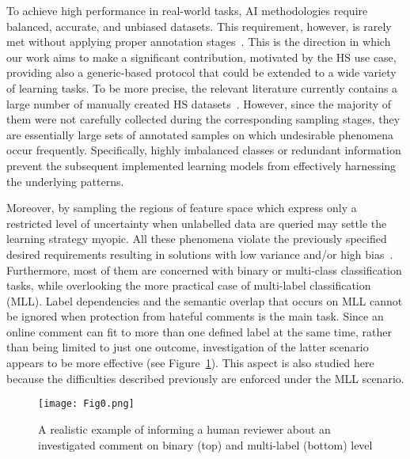 \documentclass{article}
\begin{document}
To achieve high performance in real-world tasks, AI methodologies require balanced, accurate, and unbiased datasets. This requirement, however, is rarely met without applying proper annotation stages~\cite{DBLP:conf/cikm/ChenMLZM19,ibrohim-budi-2019-multi}. This is the direction in which our work aims to make a significant contribution, motivated by the HS use case, providing also a generic-based protocol that could be extended to a wide variety of learning tasks. To be more precise, the relevant literature currently contains a large number of manually created HS datasets~\cite{waseem-hovy,DBLP:conf/naacl/ZampieriMNRFK19}. However, since the majority of them were not carefully collected during the corresponding sampling stages, they are essentially large sets of annotated samples on which undesirable phenomena occur frequently. Specifically, highly imbalanced classes or redundant information prevent the subsequent implemented learning models from effectively harnessing the underlying patterns. 

Moreover, by sampling the regions of feature space which express only a restricted level of uncertainty when unlabelled data are queried may settle the learning strategy myopic. All these phenomena violate the previously specified desired requirements resulting in solutions with low variance and/or high bias~\cite{DBLP:conf/lrec/RosendaalCN20}. Furthermore, most of them are concerned with binary or multi-class classification tasks, while overlooking the more practical case of multi-label classification (MLL). Label dependencies and the semantic overlap that occurs on MLL cannot be ignored when protection from hateful comments is the main task. Since an online comment can fit to more than one defined label at the same time, rather than being limited to just one outcome, investigation of the latter scenario appears to be more effective (see Figure~\ref{fig:labels}). This aspect is also studied here because the difficulties described previously are enforced under the MLL scenario.

\begin{figure}[!ht]
    \centering
    \texttt{[image: Fig0.png]}
    \caption{A realistic example of informing a human reviewer about an investigated comment on binary (top) and multi-label (bottom) level}
    \label{fig:labels}
\end{figure}
\end{document}
